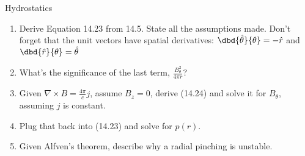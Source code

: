 
    Hydrostatics
       \begin{enumerate}
           \item {} Derive Equation 14.23 from 14.5.  State all the
               assumptions made. Don't forget that the unit vectors have spatial
               derivatives:
               $\dbd{\hat{\theta}}{\theta} = -\hat{r}$ and
               $\dbd{\hat{r}}{\theta}=\hat{\theta}$
            \item {} What's the significance of the last term,
                $\frac{B_\theta^2}{4 \pi r}$?
            \item {} Given $\nabla\times B=\frac{4 \pi}{c} j$, assume
                $B_z=0$, derive
                (14.24) and solve it for $B_\theta$, assuming $j$ is constant.
            \item {} Plug that back into (14.23) and solve for $p(r)$.
            \item {} Given Alfven's theorem, describe why a radial pinching
                is unstable.
       \end{enumerate}

